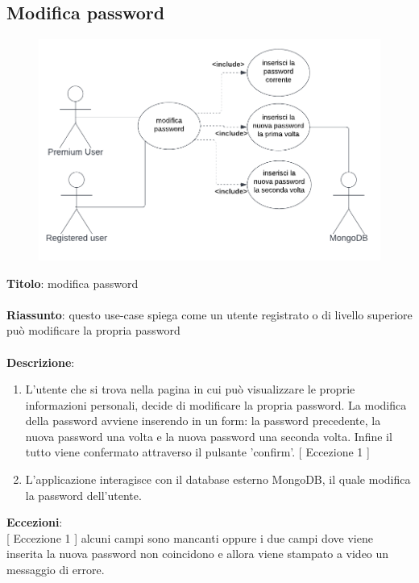 \subsection{Modifica password} \label{req_modifica_password}

\begin{figure}[!h]
\centering
\includegraphics[scale=0.35]{images/use_case_modifica_password.png}
\end{figure}
\noindent
\textbf{Titolo}: modifica password \\
\\
\textbf{Riassunto}: questo use-case spiega come un utente registrato o di livello superiore può modificare la propria password \\
\\
\textbf{Descrizione}:
\begin{enumerate}
    \item L'utente che si trova nella pagina in cui può visualizzare le proprie informazioni personali, decide di modificare la propria password. La modifica della password avviene inserendo in un form: la password precedente, la nuova password una volta e la nuova password una seconda volta. Infine il tutto viene confermato attraverso il pulsante 'confirm'. {[ Eccezione 1 ]}
    \item L'applicazione interagisce con il database esterno MongoDB, il quale modifica la password dell'utente.
\end{enumerate}
\textbf{Eccezioni}: \\
{[ Eccezione 1 ]} alcuni campi sono mancanti oppure i due campi dove viene inserita la nuova password non coincidono e allora viene stampato a video un messaggio di errore.
\newpage

